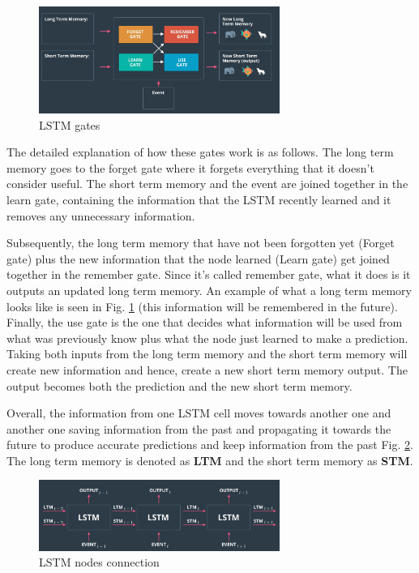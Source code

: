 \documentclass{article}
\begin{document}
\begin{figure}[ht]
    \centering
    \includegraphics[width=0.7\textwidth,height=0.7\textheight,keepaspectratio]{images/lstm_example2.png}
    \captionsetup{justification=centering}
    \caption{LSTM gates}
    \label{fig:f7}
\end{figure}

The detailed explanation of how these gates work is as follows. The long term memory goes to the forget gate where it forgets everything that it doesn't consider useful. The short term memory and the event are joined together in the learn gate, containing the information that the LSTM recently learned and it removes any unnecessary information.

Subsequently, the long term memory that have not been forgotten yet (Forget gate) plus the new information that the node learned (Learn gate) get joined together in the remember gate. Since it's called remember gate, what it does is it outputs an updated long term memory. An example of what a long term memory looks like is seen in Fig. \ref{fig:f7} (this information will be remembered in the future). Finally, the use gate is the one that decides what information will be used from what was previously know plus what the node just learned to make a prediction. Taking both inputs from the long term memory and the short term memory will create new information and hence, create a new short term memory output. The output becomes both the prediction and the new short term memory.
 
Overall, the information from one LSTM cell moves towards another one and another one saving information from the past and propagating it towards the future to produce accurate predictions and keep information from the past Fig. \ref{fig:f8}. The long term memory is denoted as \textbf{LTM} and the short term memory as \textbf{STM}.
 
\begin{figure}[ht]
    \centering
    \includegraphics[width=0.7\textwidth,height=0.7\textheight,keepaspectratio]{images/lstm_nodes.png}
    \captionsetup{justification=centering}
    \caption{LSTM nodes connection}
    \label{fig:f8}
\end{figure}
 

\printbibliography
\end{document}
